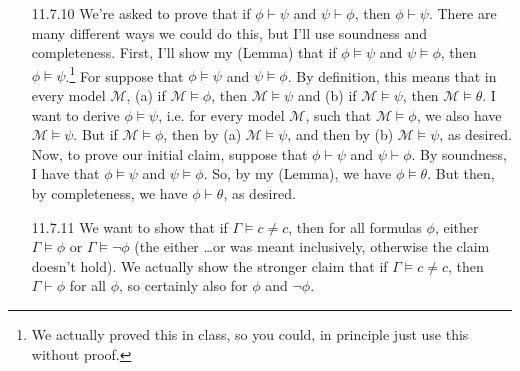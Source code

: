 \begin{itemize}
                          \item[11.7.10] We're asked to prove that if
                            $\phi\vdash\psi$ and $\psi\vdash\phi$,
                            then $\phi\vdash\psi$. There are many
                            different ways we could do this, but I'll
                            use soundness and completeness. First,
                            I'll show my (Lemma) that  if
                            $\phi\vDash\psi$ and $\psi\vDash\phi$,
                            then $\phi\vDash\psi$.\footnote{We
                              actually proved this in class, so you
                              could, in principle just use this
                              without proof.} For suppose that
                            $\phi\vDash\psi$ and
                            $\psi\vDash\phi$. By definition, this
                            means that in every 
                            model $\mathcal{M}$, (a) if $\mathcal{M}\vDash
                            \phi$, then $\mathcal{M}\vDash \psi$ and (b)
                            if $\mathcal{M}\vDash \psi$, then
                            $\mathcal{M}\vDash\theta$. I want to
                            derive $\phi\vDash\psi$, i.e. for every
                            model $\mathcal{M}$,
                            such that $\mathcal{M}\vDash\phi$, we also
                            have $\mathcal{M}\vDash\psi$. But if
                            $\mathcal{M}\vDash\phi$, then by (a)
                            $\mathcal{M}\vDash\psi$, and then by (b)
                            $\mathcal{M}\vDash\psi$, as desired. Now,
                            to prove our initial claim, suppose that
                            $\phi\vdash\psi$ and $\psi\vdash\phi$. By
                            soundness, I have that  $\phi\vDash\psi$
                            and $\psi\vDash\phi$. So, by my (Lemma), we
                            have $\phi\vDash\theta$. But then, by
                            completeness, we have $\phi\vdash\theta$,
                            as desired.

                            \item[11.7.11] We want to show that if
                              $\Gamma\vDash c\neq c$, then for all
                              formulas $\phi$, either $\Gamma\vDash\phi$ or
                              $\Gamma\vDash\neg\phi$ (the either
                              \dots or was meant
                              inclusively, otherwise the claim doesn't
                              hold). We actually show the stronger
                              claim that if $\Gamma\vDash c\neq c$,
                              then $\Gamma\vdash\phi$ for all $\phi$,
                              so certainly also for $\phi$ and
                              $\neg\phi$.


\end{itemize}
